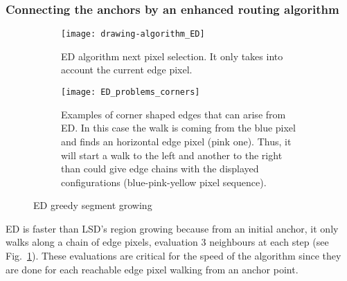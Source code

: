 \documentclass[preprint,12pt]{elsarticle}
\begin{document}
\subsubsection{Connecting the anchors by an enhanced routing algorithm}
\label{sec:drawing-algorithm}

\begin{figure}
    \begin{subfigure}[t]{1.0\linewidth}
    \centering
    \texttt{[image: drawing-algorithm\_ED]}
    \caption{ED algorithm next pixel selection. It only takes into account the current edge pixel.}
    \label{fig:edge-drawing}
    \end{subfigure}
    \begin{subfigure}[t]{1.0\linewidth}
\centering
    \texttt{[image: ED\_problems\_corners]}
    \caption{Examples of corner shaped edges that can arise from ED. In this case the walk is coming from the blue pixel and finds an horizontal edge pixel (pink one). Thus, it will start a walk to the left and another to the right than could give edge chains with the displayed configurations (blue-pink-yellow pixel sequence).}
    \label{fig:edge-drawing-problems-corners}
    \end{subfigure}
    \caption{ED greedy segment growing}
\end{figure}

ED is faster than LSD's region growing because from an initial anchor, it only walks along a chain of edge pixels, evaluation  3 neighbours at each step (see Fig.~\ref{fig:edge-drawing}). These evaluations are critical for the speed of the algorithm since they are done for each reachable edge pixel walking from an anchor point. 
\end{document}
